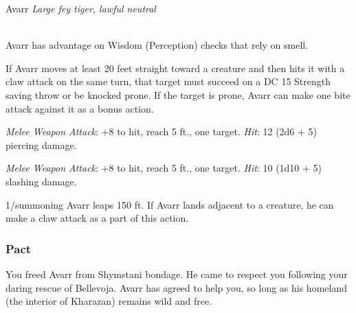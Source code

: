 \documentclass[letterpaper,10pt,twoside,twocolumn,openany]{book}
\begin{document}
\begin{monsterbox}{Avarr}
	\textit{Large fey tiger, lawful neutral}\\
	\hline%
	\basics[%
	armorclass = 13,
	hitpoints  = \dice{7d12 + 18},
	speed      = {50 ft, climb 40 ft, swim 30 ft}
	]
	\hline%
	\stats[
    STR = \stat{20}, %
    DEX = \stat{15},
    CON = \stat{17},
    WIS = \stat{14},
    CHA = \stat{9}
	]
	\hline%
	\details[%
	skills = {Perception +5, Stealth +8},
	senses = {darkvision 60 ft, pp 15},
	languages = {Giant Tiger, understands Common and Sylvan but cannot speak},
	challenge = 2
	]
	\hline \\[1mm]
	\begin{monsteraction}
		Avarr has advantage on Wisdom (Perception) checks that rely on smell.
	\end{monsteraction}
	
	\begin{monsteraction}[Pounce]
		If Avarr moves at least 20 feet straight toward a creature and then hits it with a claw attack on the same turn, 
		that target must succeed on a DC 15 Strength saving throw or be knocked prone. 
		If the target is prone, Avarr can make one bite attack against it as a bonus action.	
	\end{monsteraction}

	\begin{monsteraction}[Bite]
		\emph{Melee Weapon Attack}: +8 to hit, reach 5 ft., one target. \emph{Hit}: 12 (2d6 + 5) piercing damage.
	\end{monsteraction}

	\begin{monsteraction}[Claw]
		\emph{Melee Weapon Attack}: +8 to hit, reach 5 ft., one target. \emph{Hit}: 10 (1d10 + 5) slashing damage.
	\end{monsteraction}

	\begin{monsteraction}
		1/summoning Avarr leaps 150 ft. If Avarr lands adjacent to a creature, he can make a claw attack as a part of this action.
	\end{monsteraction}
\end{monsterbox}

\subsubsection{Pact}
You freed Avarr from Shymstani bondage.
He came to respect you following your daring rescue of Bellevoja. 
Avarr has agreed to help you, so long as his homeland (the interior of Kharazan) remains wild and free.
\end{document}
